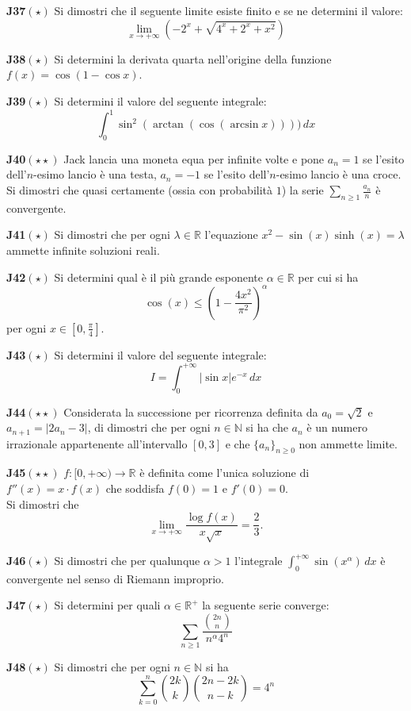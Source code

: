 \documentclass[a4paper,twoside]{article}
\theoremstyle{definition}
\numberwithin{theorem}{section}
\begin{document}
\textbf{J37}$(\star)$ Si dimostri che il seguente limite esiste finito e se ne determini il valore:
$$ \lim_{x\to +\infty} \left(-2^x+\sqrt{4^x+2^x+x^2}\right) $$

\textbf{J38}$(\star)$ Si determini la derivata quarta nell'origine della funzione $f(x)=\cos(1-\cos x)$.

\textbf{J39}$(\star)$ Si determini il valore del seguente integrale:
$$ \int_{0}^{1}\sin^2(\arctan(\cos(\arcsin x))))\,dx $$ 

\textbf{J40}$(\star\star)$ Jack lancia una moneta equa per infinite volte e pone $a_n=1$ se l'esito dell'$n$-esimo lancio è una testa, $a_n=-1$ se l'esito dell'$n$-esimo lancio è una croce. Si dimostri che quasi certamente (ossia con probabilità $1$) la serie $\sum_{n\geq 1}\frac{a_n}{n}$ è convergente.

\textbf{J41}$(\star)$ Si dimostri che per ogni $\lambda\in\mathbb{R}$ l'equazione $x^2-\sin(x)\sinh(x)=\lambda$ ammette infinite soluzioni reali.

\textbf{J42}$(\star)$ Si determini qual è il più grande esponente $\alpha\in\mathbb{R}$ per cui si ha
$$ \cos(x)\leq\left(1-\frac{4x^2}{\pi^2}\right)^\alpha $$
per ogni $x\in\left[0,\frac{\pi}{4}\right]$.

\textbf{J43}$(\star)$ Si determini il valore del seguente integrale:
$$ I=\int_{0}^{+\infty}\left|\sin x\right| e^{-x}\,dx $$

\textbf{J44}$(\star\star)$ Considerata la successione per ricorrenza definita da $a_0=\sqrt{2}$ e $a_{n+1}=|2a_n-3|$, di dimostri che per ogni $n\in\mathbb{N}$ si ha che $a_n$ è un numero irrazionale appartenente all'intervallo $[0,3]$ e che $\{a_n\}_{n\geq 0}$ non ammette limite.

\textbf{J45}$(\star\star)$ $f:[0,+\infty)\to\mathbb{R}$ è definita come l'unica soluzione di $f''(x)=x\cdot f(x)$ che soddisfa $f(0)=1$ e $f'(0)=0$.\\ Si dimostri che 
$$ \lim_{x\to +\infty}\frac{\log f(x)}{x\sqrt{x}} = \frac{2}{3}.$$

\textbf{J46}$(\star)$ Si dimostri che per qualunque $\alpha > 1$ l'integrale $\int_{0}^{+\infty}\sin(x^\alpha)\,dx $ è convergente nel senso di Riemann improprio.

\textbf{J47}$(\star)$ Si determini per quali $\alpha\in\mathbb{R}^+$ la seguente serie converge:
$$ \sum_{n\geq 1}\frac{\binom{2n}{n}}{n^\alpha 4^n} $$

\textbf{J48}$(\star)$ Si dimostri che per ogni $n\in\mathbb{N}$ si ha
$$ \sum_{k=0}^{n}\binom{2k}{k}\binom{2n-2k}{n-k} = 4^n $$
\end{document}
